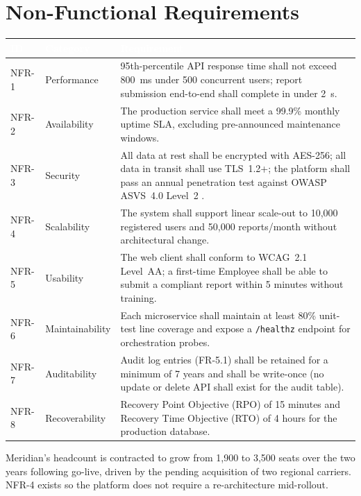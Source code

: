 \section{Non-Functional Requirements}

\begin{center}
\small
\begin{tabularx}{\textwidth}{@{}l l X@{}}
\toprule
\rowcolor{navydark}
\textcolor{white}{\textbf{ID}} & \textcolor{white}{\textbf{Category}} & \textcolor{white}{\textbf{Requirement}} \\
\midrule
NFR-1 & Performance & 95th-percentile API response time shall not exceed 800~ms under 500
concurrent users; report submission end-to-end shall complete in under 2~s. \\
\rowcolor{lightgray}
NFR-2 & Availability & The production service shall meet a 99.9\% monthly uptime SLA, excluding
pre-announced maintenance windows. \\
NFR-3 & Security & All data at rest shall be encrypted with AES-256; all data in transit shall
use TLS~1.2+; the platform shall pass an annual penetration test against OWASP ASVS~4.0
Level~2 \cite{owaspasvs}. \\
\rowcolor{lightgray}
NFR-4 & Scalability & The system shall support linear scale-out to 10,000 registered users and
50,000 reports/month without architectural change. \\
NFR-5 & Usability & The web client shall conform to WCAG~2.1 Level~AA; a first-time Employee
shall be able to submit a compliant report within 5 minutes without training. \\
\rowcolor{lightgray}
NFR-6 & Maintainability & Each microservice shall maintain at least 80\% unit-test line
coverage and expose a \texttt{/healthz} endpoint for orchestration probes. \\
NFR-7 & Auditability & Audit log entries (FR-5.1) shall be retained for a minimum of 7 years
and shall be write-once (no update or delete API shall exist for the audit table). \\
\rowcolor{lightgray}
NFR-8 & Recoverability & Recovery Point Objective (RPO) of 15 minutes and Recovery Time
Objective (RTO) of 4 hours for the production database. \\
\bottomrule
\end{tabularx}
\end{center}

\begin{center}
\begin{minipage}{0.9\textwidth}
\begin{tcolorbox}[colback=white,colframe=accentteal,boxrule=0.8pt,arc=2pt,title={\faPen\ Rationale --- Why NFR-4 Exists},fonttitle=\bfseries\color{navydark},colbacktitle=lightgray]
\small
Meridian's headcount is contracted to grow from 1,900 to 3,500 seats over the two years
following go-live, driven by the pending acquisition of two regional carriers. NFR-4 exists so
the platform does not require a re-architecture mid-rollout.
\end{tcolorbox}
\end{minipage}
\end{center}
